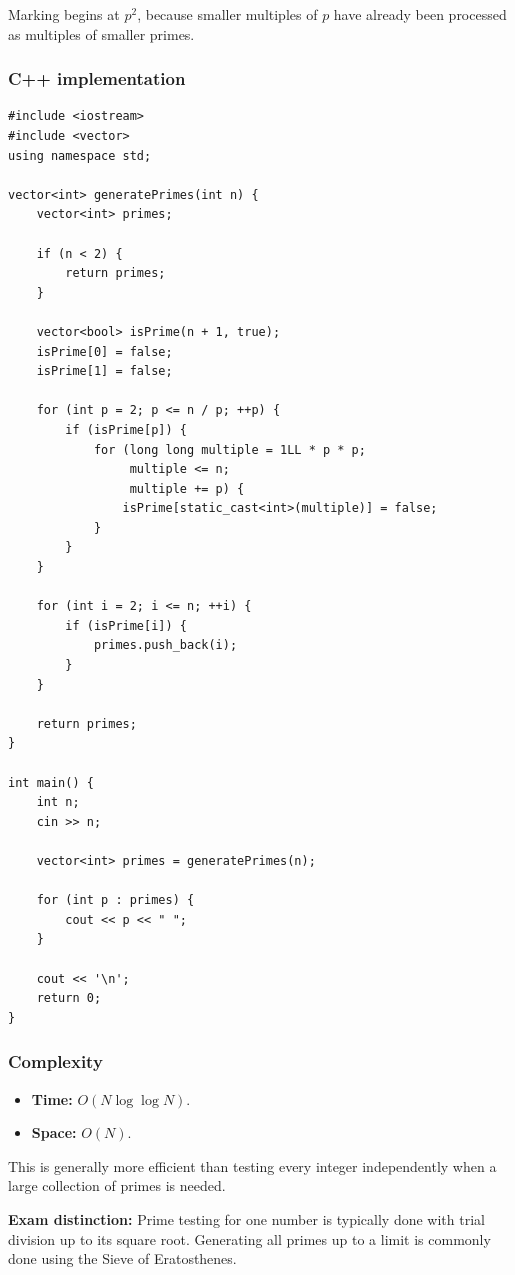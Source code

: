 Marking begins at $p^2$, because smaller multiples of $p$ have already been processed as multiples of smaller primes.

\subsubsection{C++ implementation}

\begin{lstlisting}[style=cppstyle]
#include <iostream>
#include <vector>
using namespace std;

vector<int> generatePrimes(int n) {
    vector<int> primes;

    if (n < 2) {
        return primes;
    }

    vector<bool> isPrime(n + 1, true);
    isPrime[0] = false;
    isPrime[1] = false;

    for (int p = 2; p <= n / p; ++p) {
        if (isPrime[p]) {
            for (long long multiple = 1LL * p * p;
                 multiple <= n;
                 multiple += p) {
                isPrime[static_cast<int>(multiple)] = false;
            }
        }
    }

    for (int i = 2; i <= n; ++i) {
        if (isPrime[i]) {
            primes.push_back(i);
        }
    }

    return primes;
}

int main() {
    int n;
    cin >> n;

    vector<int> primes = generatePrimes(n);

    for (int p : primes) {
        cout << p << " ";
    }

    cout << '\n';
    return 0;
}
\end{lstlisting}

\subsubsection{Complexity}

\begin{itemize}
    \item \textbf{Time:} $O(N\log\log N)$.
    \item \textbf{Space:} $O(N)$.
\end{itemize}

This is generally more efficient than testing every integer independently when a large collection of primes is needed.

\textbf{Exam distinction:} Prime testing for one number is typically done with trial division up to its square root. Generating all primes up to a limit is commonly done using the Sieve of Eratosthenes.

